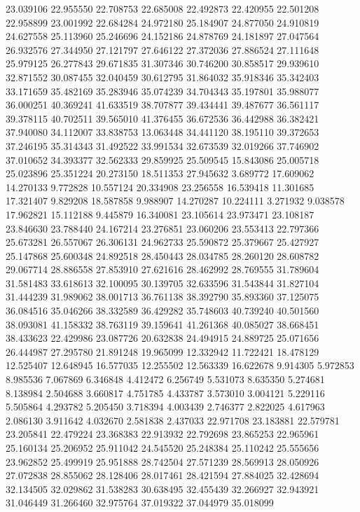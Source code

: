 23.039106
22.955550
22.708753
22.685008
22.492873
22.420955
22.501208
22.958899
23.001992
22.684284
24.972180
25.184907
24.877050
24.910819
24.627558
25.113960
25.246696
24.152186
24.878769
24.181897
27.047564
26.932576
27.344950
27.121797
27.646122
27.372036
27.886524
27.111648
25.979125
26.277843
29.671835
31.307346
30.746200
30.858517
29.939610
32.871552
30.087455
32.040459
30.612795
31.864032
35.918346
35.342403
33.171659
35.482169
35.283946
35.074239
34.704343
35.197801
35.988077
36.000251
40.369241
41.633519
38.707877
39.434441
39.487677
36.561117
39.378115
40.702511
39.565010
41.376455
36.672536
36.442988
36.382421
37.940080
34.112007
33.838753
13.063448
34.441120
38.195110
39.372653
37.246195
35.314343
31.492522
33.991534
32.673539
32.019266
37.746902
37.010652
34.393377
32.562333
29.859925
25.509545
15.843086
25.005718
25.023896
25.351224
20.273150
18.511353
27.945632
3.689772
17.609062
14.270133
9.772828
10.557124
20.334908
23.256558
16.539418
11.301685
17.321407
9.829208
18.587858
9.988907
14.270287
10.224111
3.271932
9.038578
17.962821
15.112188
9.445879
16.340081
23.105614
23.973471
23.108187
23.846630
23.788440
24.167214
23.276851
23.060206
23.553413
22.797366
25.673281
26.557067
26.306131
24.962733
25.590872
25.379667
25.427927
25.147868
25.600348
24.892518
28.450443
28.034785
28.260120
28.608782
29.067714
28.886558
27.853910
27.621616
28.462992
28.769555
31.789604
31.581483
33.618613
32.100095
30.139705
32.633596
31.543844
31.827104
31.444239
31.989062
38.001713
36.761138
38.392790
35.893360
37.125075
36.084516
35.046266
38.332589
36.429282
35.748603
40.739240
40.501560
38.093081
41.158332
38.763119
39.159641
41.261368
40.085027
38.668451
38.433623
22.429986
23.087726
20.632838
24.494915
24.889725
25.071656
26.444987
27.295780
21.891248
19.965099
12.332942
11.722421
18.478129
12.525407
12.648945
16.577035
12.255502
12.563339
16.622678
9.914305
5.972853
8.985536
7.067869
6.346848
4.412472
6.256749
5.531073
8.635350
5.274681
8.138984
2.504688
3.660817
4.751785
4.433787
3.573010
3.004121
5.229116
5.505864
4.293782
5.205450
3.718394
4.003439
2.746377
2.822025
4.617963
2.086130
3.911642
4.032670
2.581838
2.437033
22.971708
23.183881
22.579781
23.205841
22.479224
23.368383
22.913932
22.792698
23.865253
22.965961
25.160134
25.206952
25.911042
24.545520
25.248384
25.110242
25.555656
23.962852
25.499919
25.951888
28.742504
27.571239
28.569913
28.050926
27.072838
28.855062
28.128406
28.017461
28.421594
27.884025
32.428694
32.134505
32.029862
31.538283
30.638495
32.455439
32.266927
32.943921
31.046449
31.266460
32.975764
37.019322
37.044979
35.018099
